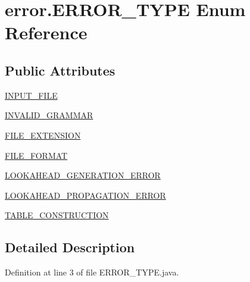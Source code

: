 \hypertarget{enumerror_1_1_e_r_r_o_r___t_y_p_e}{\section{error.\-E\-R\-R\-O\-R\-\_\-\-T\-Y\-P\-E Enum Reference}
\label{enumerror_1_1_e_r_r_o_r___t_y_p_e}
}
\subsection*{Public Attributes}
\begin{DoxyCompactItemize}
\item 
\hyperlink{enumerror_1_1_e_r_r_o_r___t_y_p_e_aaf121a60e23c7992ec551d81ebd96f1d}{I\-N\-P\-U\-T\-\_\-\-F\-I\-L\-E}
\item 
\hyperlink{enumerror_1_1_e_r_r_o_r___t_y_p_e_ac6422d34d3c09d323665c858be149f21}{I\-N\-V\-A\-L\-I\-D\-\_\-\-G\-R\-A\-M\-M\-A\-R}
\item 
\hyperlink{enumerror_1_1_e_r_r_o_r___t_y_p_e_a9fa75306960e1fb136a04aa2d4526cf3}{F\-I\-L\-E\-\_\-\-E\-X\-T\-E\-N\-S\-I\-O\-N}
\item 
\hyperlink{enumerror_1_1_e_r_r_o_r___t_y_p_e_a344986e464ffe95c490b7b2278b72d4f}{F\-I\-L\-E\-\_\-\-F\-O\-R\-M\-A\-T}
\item 
\hyperlink{enumerror_1_1_e_r_r_o_r___t_y_p_e_a34b2ee3da4f35c59f641f0eb1e60d06b}{L\-O\-O\-K\-A\-H\-E\-A\-D\-\_\-\-G\-E\-N\-E\-R\-A\-T\-I\-O\-N\-\_\-\-E\-R\-R\-O\-R}
\item 
\hyperlink{enumerror_1_1_e_r_r_o_r___t_y_p_e_a583a3c72741f960e25fb8e45864e40cb}{L\-O\-O\-K\-A\-H\-E\-A\-D\-\_\-\-P\-R\-O\-P\-A\-G\-A\-T\-I\-O\-N\-\_\-\-E\-R\-R\-O\-R}
\item 
\hyperlink{enumerror_1_1_e_r_r_o_r___t_y_p_e_ae438784bc1f218c01def311d198edaaa}{T\-A\-B\-L\-E\-\_\-\-C\-O\-N\-S\-T\-R\-U\-C\-T\-I\-O\-N}
\end{DoxyCompactItemize}


\subsection{Detailed Description}


Definition at line 3 of file E\-R\-R\-O\-R\-\_\-\-T\-Y\-P\-E.\-java.



